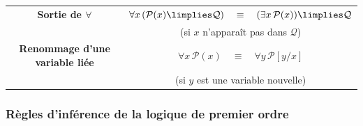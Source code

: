 \documentclass[11pt,class=report,crop=false]{standalone}
\begin{document}
\begin{center}
\begin{tabular}{|c|c|}
        \textbf{Sortie de $\forall$}
        &
        $\forall x\,(\mathcal P(x)\limplies\mathcal Q)
        \quad \equiv \quad
        (\exists x\,\mathcal P(x))
        \limplies
        \mathcal Q$
        \\[-0.7em]
        &
        {\small (si $x$ n'apparaît pas dans $\mathcal Q$)}
        \\ \hline

        \textbf{Renommage d'une variable liée}
        &
        $\forall x\,\mathcal P(x)
        \quad \equiv \quad
        \forall y\,\mathcal P[y/x]$
        \\[-0.7em]
        &
        {\small (si $y$ est une variable nouvelle)}
        \\ \hline

    \end{tabular}
\end{center}


\subsubsection{Règles d'inférence de la logique de premier ordre}
\end{document}
